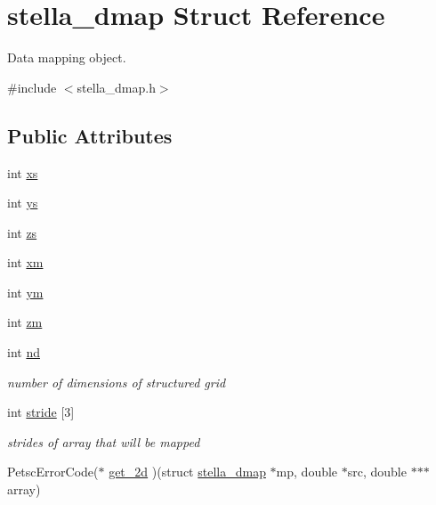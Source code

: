 \hypertarget{structstella__dmap}{}\section{stella\+\_\+dmap Struct Reference}
\label{structstella__dmap}


Data mapping object.  




{\ttfamily \#include $<$stella\+\_\+dmap.\+h$>$}

\subsection*{Public Attributes}
\begin{DoxyCompactItemize}
\item 
int \mbox{\hyperlink{structstella__dmap_ae1538110e94bee9026b476a681c44946}{xs}}
\item 
int \mbox{\hyperlink{structstella__dmap_a94190e8f2f3c1efee08b51752d95c6ec}{ys}}
\item 
int \mbox{\hyperlink{structstella__dmap_a06bde1f9d13046c7f907a2ccdd38345e}{zs}}
\item 
int \mbox{\hyperlink{structstella__dmap_a44f81af4ad90a0daaa293a5b27d23cd8}{xm}}
\item 
int \mbox{\hyperlink{structstella__dmap_a1a8ce114a2fbc771a693a14353588ab9}{ym}}
\item 
int \mbox{\hyperlink{structstella__dmap_af16139e8ef8d7724bbeb8af004176c68}{zm}}
\item 
int \mbox{\hyperlink{structstella__dmap_a70743458c3c20e0bc910126f429ef45b}{nd}}
\begin{DoxyCompactList}\small\item\em number of dimensions of structured grid \end{DoxyCompactList}\item 
int \mbox{\hyperlink{structstella__dmap_afe5870832e891c0254aa65a3f2f72e3e}{stride}} \mbox{[}3\mbox{]}
\begin{DoxyCompactList}\small\item\em strides of array that will be mapped \end{DoxyCompactList}\item 
Petsc\+Error\+Code($\ast$ \mbox{\hyperlink{structstella__dmap_a66a98f3b85ce77dbfdfbfc72040c6e3c}{get\+\_\+2d}} )(struct \mbox{\hyperlink{structstella__dmap}{stella\+\_\+dmap}} $\ast$mp, double $\ast$src, double $\ast$$\ast$$\ast$array)
\item 

\end{DoxyCompactItemize}
